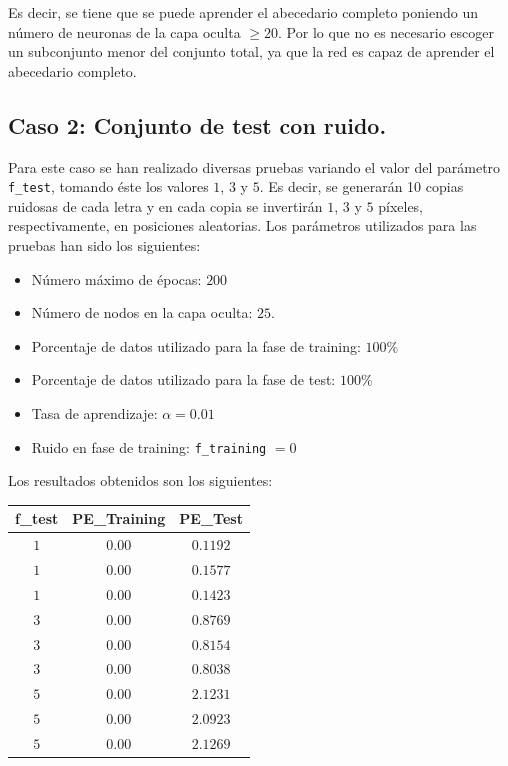 \documentclass[spanish]{assignment}
\begin{document}
	Es decir, se tiene que se puede aprender el abecedario completo poniendo un número de neuronas de la capa oculta $\ge 20$. Por lo que no es necesario escoger un subconjunto menor del conjunto total, ya que la red es capaz de aprender el abecedario completo.
	
	\subsection{Caso 2: Conjunto de test con ruido.}
	Para este caso se han realizado diversas pruebas variando el valor del parámetro \texttt{f\_test}, tomando éste los valores $1$, $3$ y $5$. Es decir, se generarán 10 copias ruidosas de cada letra y en cada copia se invertirán $1$, $3$ y $5$ píxeles, respectivamente, en posiciones aleatorias.
	Los parámetros utilizados para las pruebas han sido los siguientes:
	\begin{itemize}
		\item Número máximo de épocas: $200$
		\item Número de nodos en la capa oculta: $25$.
		\item Porcentaje de datos utilizado para la fase de training: $100\%$
		\item Porcentaje de datos utilizado para la fase de test: $100\%$
		\item Tasa de aprendizaje: $\alpha = 0.01$
		\item Ruido en fase de training: \texttt{f\_training} $= 0$
	\end{itemize}

	Los resultados obtenidos son los siguientes:
	\begin{center}
		\begin{tabular}{|c|c|c|}
			\hline
			\textbf{f\_test} & \textbf{PE\_Training} & \textbf{PE\_Test} \\ 
			\hline
			$1$ & $0.00$ & $0.1192$ \\
			$1$ & $0.00$ & $0.1577$ \\
			$1$ & $0.00$ & $0.1423$ \\
			\hline
			$3$ & $0.00$ & $0.8769$ \\
			$3$ & $0.00$ & $0.8154$ \\
			$3$ & $0.00$ & $0.8038$ \\
			\hline
			$5$ & $0.00$ & $2.1231$ \\
			$5$ & $0.00$ & $2.0923$ \\
			$5$ & $0.00$ & $2.1269$ \\
			\hline
		\end{tabular}
	\end{center}
	
\end{document}
